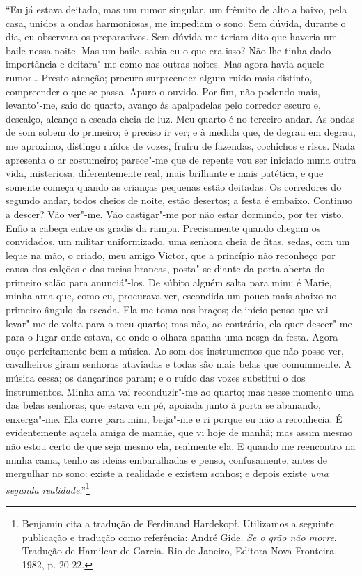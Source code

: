 ``Eu já estava deitado, mas um rumor singular, um frêmito de alto a
baixo, pela casa, unidos a ondas harmoniosas, me impediam o sono. Sem
dúvida, durante o dia, eu observara os preparativos. Sem dúvida me
teriam dito que haveria um baile nessa noite. Mas um baile, sabia eu o
que era isso? Não lhe tinha dado importância e deitara"-me como nas
outras noites. Mas agora havia aquele rumor\ldots{} Presto atenção; procuro
surpreender algum ruído mais distinto, compreender o que se passa. Apuro
o ouvido. Por fim, não podendo mais, levanto"-me, saio do quarto, avanço
às apalpadelas pelo corredor escuro e, descalço, alcanço a escada cheia
de luz. Meu quarto é no terceiro andar. As ondas de som sobem do
primeiro; é preciso ir ver; e à medida que, de degrau em degrau, me
aproximo, distingo ruídos de vozes, frufru de fazendas, cochichos e
risos. Nada apresenta o ar costumeiro; parece"-me que de repente vou ser
iniciado numa outra vida, misteriosa, diferentemente real, mais
brilhante e mais patética, e que somente começa quando as crianças
pequenas estão deitadas. Os corredores do segundo andar, todos cheios de
noite, estão desertos; a festa é embaixo. Continuo a descer? Vão ver"-me.
Vão castigar"-me por não estar dormindo, por ter visto. Enfio a cabeça
entre os gradis da rampa. Precisamente quando chegam os convidados, um
militar uniformizado, uma senhora cheia de fitas, sedas, com um leque na
mão, o criado, meu amigo Victor, que a princípio não reconheço por causa
dos calções e das meias brancas, posta"-se diante da porta aberta do
primeiro salão para anunciá"-los. De súbito alguém salta para mim: é
Marie, minha ama que, como eu, procurava ver, escondida um pouco mais
abaixo no primeiro ângulo da escada. Ela me toma nos braços; de início
penso que vai levar"-me de volta para o meu quarto; mas não, ao
contrário, ela quer descer"-me para o lugar onde estava, de onde o olhara
apanha uma nesga da festa. Agora ouço perfeitamente bem a música. Ao som
dos instrumentos que não posso ver, cavalheiros giram senhoras ataviadas
e todas são mais belas que comummente. A música cessa; os dançarinos
param; e o ruído das vozes substitui o dos instrumentos. Minha ama vai
reconduzir"-me ao quarto; mas nesse momento uma das belas senhoras, que
estava em pé, apoiada junto à porta se abanando, enxerga"-me. Ela corre
para mim, beija"-me e ri porque eu não a reconhecia. É evidentemente
aquela amiga de mamãe, que vi hoje de manhã; mas assim mesmo não estou
certo de que seja mesmo ela, realmente ela. E quando me reencontro na
minha cama, tenho as ideias embaralhadas e penso, confusamente, antes de
mergulhar no sono: existe a realidade e existem sonhos; e depois existe
\emph{uma segunda realidade}.''\footnote{Benjamin cita a tradução
  de Ferdinand Hardekopf. Utilizamos a seguinte publicação e tradução
  como referência: André Gide. \emph{Se o grão não morre}. Tradução de
  Hamilcar de Garcia. Rio de Janeiro, Editora Nova Fronteira, 1982, p.
  20-22. \versal{[N. T.]}}

